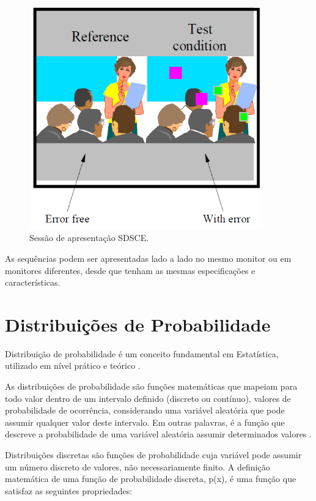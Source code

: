 \begin{figure}[!htb]
	\centering
	\includegraphics[width=0.9\textwidth]{./imgs/sdsce.png}
	\caption{Sessão de apresentação SDSCE.}
	\label{fig:sdsce}
\end{figure}

As sequências podem ser apresentadas lado a lado no mesmo monitor ou em monitores diferentes, desde que tenham as mesmas especificações e características.

\section{Distribuições de Probabilidade}

Distribuição de probabilidade é um conceito fundamental em Estatística, utilizado em nível prático e teórico \cite{distteoria}.

As distribuições de probabilidade são funções matemáticas que mapeiam para todo valor dentro de um intervalo definido (discreto ou contínuo), valores de probabilidade de ocorrência, considerando uma variável aleatória que pode assumir qualquer valor deste intervalo\cite{distteoria}. Em outras palavras, é a função que descreve a probabilidade de uma variável aleatória assumir determinados valores \cite{wikidistribuicoes}.
 
Distribuições discretas são funções de probabilidade cuja variável pode assumir um número discreto de valores, não necessariamente finito. A definição matemática de uma função de probabilidade discreta, p(x), é uma função que satisfaz as seguintes propriedades:

